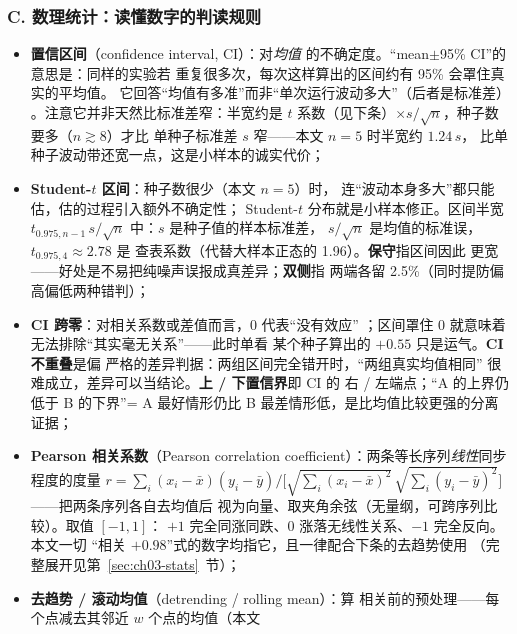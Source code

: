 \subsubsection*{C. 数理统计：读懂数字的判读规则}

\begin{itemize}
  \item \textbf{置信区间}（confidence interval, CI）：对\emph{均值}
        的不确定度。``mean$\pm$95\% CI''的意思是：同样的实验若
        重复很多次，每次这样算出的区间约有 95\% 会罩住真实的平均值。
        它回答``均值有多准''而非``单次运行波动多大''（后者是标准差）
        。注意它并非天然比标准差窄：半宽约是
        $t$ 系数（见下条）$\times s/\sqrt{n}$，种子数要多（$n\gtrsim8$）才比
        单种子标准差 $s$ 窄——本文 $n{=}5$ 时半宽约 $1.24\,s$，
        比单种子波动带还宽一点，这是小样本的诚实代价；
  \item \textbf{Student-$t$ 区间}：种子数很少（本文 $n{=}5$）时，
        连``波动本身多大''都只能估，估的过程引入额外不确定性；
        Student-$t$ 分布就是小样本修正。区间半宽
        $t_{0.975,n-1}\,s/\sqrt{n}$ 中：$s$ 是种子值的样本标准差，
        $s/\sqrt{n}$ 是均值的标准误，$t_{0.975,4}\approx2.78$ 是
        查表系数（代替大样本正态的 1.96）。\textbf{保守}指区间因此
        更宽——好处是不易把纯噪声误报成真差异；\textbf{双侧}指
        两端各留 2.5\%（同时提防偏高偏低两种错判）；
  \item \textbf{CI 跨零}：对相关系数或差值而言，0 代表``没有效应''
        ；区间罩住 0 就意味着无法排除``其实毫无关系''——此时单看
        某个种子算出的 $+0.55$ 只是运气。\textbf{CI 不重叠}是偏
        严格的差异判据：两组区间完全错开时，``两组真实均值相同''
        很难成立，差异可以当结论。\textbf{上 / 下置信界}即 CI 的
        右 / 左端点；``A 的上界仍低于 B 的下界''= A 最好情形仍比
        B 最差情形低，是比均值比较更强的分离证据；
  \item \textbf{Pearson 相关系数}（Pearson correlation
        coefficient）：两条等长序列\emph{线性}同步程度的度量
        $r=\sum_i(x_i-\bar x)(y_i-\bar y)\big/
        \bigl[\sqrt{\sum_i(x_i-\bar x)^{2}}\,
        \sqrt{\sum_i(y_i-\bar y)^{2}}\bigr]$——把两条序列各自去均值后
        视为向量、取夹角余弦（无量纲，可跨序列比较）。取值 $[-1,1]$：
        $+1$ 完全同涨同跌、$0$ 涨落无线性关系、$-1$ 完全反向。本文一切
        ``相关 $+0.98$''式的数字均指它，且一律配合下条的去趋势使用
        （完整展开见第~\ref{sec:ch03-stats}~节）；
  \item \textbf{去趋势 / 滚动均值}（detrending / rolling mean）：算
        相关前的预处理——每个点减去其邻近 $w$ 个点的均值（本文

\end{itemize}
